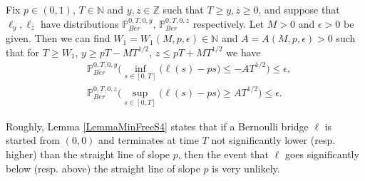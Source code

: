 \begin{lemma}\label{LemmaMinFreeS4} Fix $p \in (0,1)$, $T \in \mathbb{N}$ and $y,z\in \mathbb{Z}$ such that $T \geq y,z \geq 0$, and suppose that $\ell_y,\ell_z$ have distributions $\mathbb{P}^{0,T,0,y}_{Ber}$, $\mathbb{P}^{0,T,0,z}_{Ber}$ respectively. Let $M > 0$ and $\epsilon > 0$ be given. Then we can find $W_1=W_1(M,p, \epsilon) \in \mathbb{N}$ and $A=A(M,p, \epsilon) > 0$ such that for $T \geq W_1$, $ y \geq p T -  MT^{1/2}$, $z \leq pT + MT^{1/2}$ we have
\begin{equation}\label{minFree1S4}
\begin{split}
&\mathbb{P}^{0,T,0,y}_{Ber}\Big( \inf_{s \in [ 0, T]}\big( \ell(s) -  ps \big) \leq -AT^{1/2} \Big) \leq \epsilon, \\ &\mathbb{P}^{0,T,0,z}_{Ber}\Big( \sup_{s \in [ 0, T]}\big( \ell(s) -  ps \big) \geq AT^{1/2} \Big) \leq \epsilon.
\end{split}
\end{equation}
\end{lemma}
\begin{remark} Roughly, Lemma \ref{LemmaMinFreeS4} states that if a Bernoulli bridge $\ell$ is started from $(0,0)$ and terminates at time $T$ not significantly lower (resp. higher) than the straight line of slope $p$, then the event that $\ell$ goes significantly below (resp. above) the straight line of slope $p$ is very unlikely.
\end{remark}
